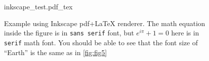 \begin{figure}[htbp]
  \centering
  {inkscape_test.pdf_tex}
  \caption{Example using Inkscape pdf+\LaTeX{} renderer. The math
    equation inside the figure is in \texttt{sans serif} font, but
    $e^{i \pi} + 1 = 0$ here is in \texttt{serif} math font. You
    should be able to see that the font size of ``Earth'' is the same
    as in \autoref{fig:fig5}}
  \label{fig:fig6}

  
\end{figure}







  

